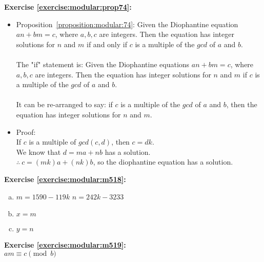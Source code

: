 \noindent\textbf{Exercise \ref{exercise:modular:prop74}:} %
\begin{itemize}
\item 
Proposition~\ref{proposition:modular:74}: Given the Diophantine equation $an + bm = c$, where $a,b,c$ are integers. Then the equation has integer solutions for $n$ and $m$ if and only if $c$ is a multiple of the $gcd$ of $a$ and $b$.\\
\\     
The "if" statement is: Given the Diophantine equations $an + bm = c$, where $a,b,c$ are integers. Then the equation has integer solutions for $n$ and $m$ if $c$ is a multiple of the $gcd$ of $a$ and $b$.\\
\\   
It can be re-arranged to say: if $c$ is a multiple of the $gcd$ of $a$ and $b$, then the equation has integer solutions for $n$ and $m$.
        
\item 
Proof:\\
If $c$ is a multiple of $gcd(c,d)$, then $c = dk$.\\
We know that $d = ma + nb$ has a solution.\\
$\therefore\ c = (mk)a + (nk)b$, so the diophantine equation has a solution. 
\end{itemize}

\noindent\textbf{Exercise \ref{exercise:modular:m518}:}%
\begin{enumerate}[(a)]
\item
$m=1590-119k$ $n=242k-3233$

\item 
$x=m$

\item
$y=n$
\end{enumerate}

\noindent\textbf{Exercise \ref{exercise:modular:m519}:}\\%
$am \equiv c \pmod{b}$\\

